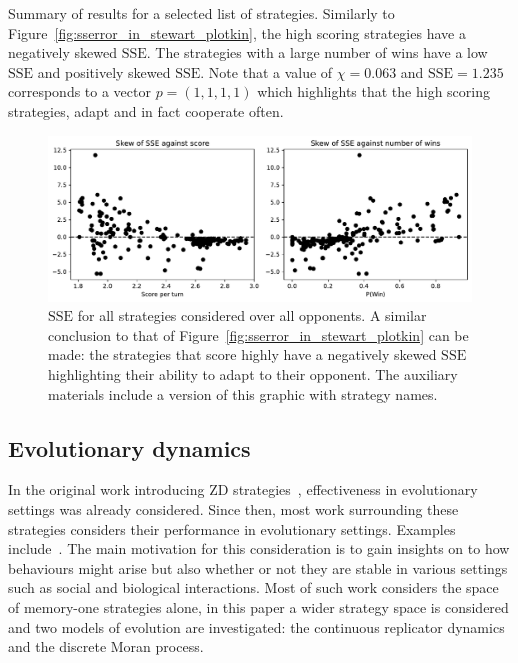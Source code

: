 \documentclass[a4paper]{article}
\newcommand{\SSe}{\text{SSE}}
\begin{document}
\begin{table}[!hbtp]
    \begin{center}
    \small
    
    \end{center}
    \caption{Summary of results for a selected list of strategies. Similarly to
        Figure~\ref{fig:sserror_in_stewart_plotkin}, the high scoring strategies
        have a negatively skewed \(\SSe\). The strategies with a
        large number of wins have a low \(\SSe\) and positively skewed
        \(\SSe\). Note that a value of \(\chi=0.063\) and \(\SSe=1.235\)
        corresponds to a vector \(p=(1,1,1,1)\) which highlights that the high
        scoring strategies, adapt and in fact cooperate often.}
    \label{tbl:overall_summary_results}
\end{table}

\begin{figure}[!htbp]
    \centering
    \includegraphics[width=\textwidth]{./assets/img/sserror_in_std/main.pdf}
    \caption{\(\SSe\) for all strategies considered over all opponents.
        A similar conclusion to that of
        Figure~\ref{fig:sserror_in_stewart_plotkin} can be made: the strategies
        that score highly have a negatively skewed \(\SSe\) highlighting their
        ability to adapt to their opponent. The auxiliary materials include a
        version of this graphic with strategy names.}
        \label{fig:sserror_in_std}
\end{figure}

\subsection{Evolutionary dynamics}\label{sec:evolutionary-dynamics}

In the original work introducing ZD strategies~\cite{Press2012}, effectiveness
in evolutionary settings was already considered. Since then, most work
surrounding these strategies considers their performance in evolutionary
settings. Examples include~\cite{adami2013evolutionary, hilbe2018partners,
Hilbe2013, hilbe2013adaptive, hilbe2015partners, ichinose2018zero, Moran1707}.
The main motivation for this consideration is to gain insights on to how
behaviours might arise but also whether or not they are stable in various
settings such as social and biological interactions. Most of such work
considers the space of memory-one strategies alone, in this paper a wider
strategy space is considered and two models of evolution are investigated: the
continuous replicator dynamics and the discrete Moran process.
\end{document}
